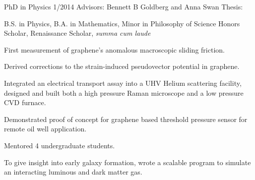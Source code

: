 {\begin{singlespace}
\bigspace

{
	\newline
	PhD in Physics 1/2014\newline
	Advisors: Bennett B Goldberg and Anna Swan \newline
	Thesis: \thesistitlelower 

	\newline
	B.S. in Physics, B.A. in Mathematics, Minor in Philosophy of Science\newline
	Honors Scholar, Renaissance Scholar, \emph{summa cum laude}\newline
}


{
	\begin{description}[noitemsep,topsep=-5pt,labelindent=15pt]
	\item[Experiment:] First measurement of graphene's anomalous macroscopic sliding friction. 
	\item[Theory:] Derived corrections to the strain-induced pseudovector potential in graphene.
	\item[Aperatus design:] Integrated an electrical transport assay into a UHV Helium scattering facility, designed and built both a high pressure Raman microscope and a low pressure CVD furnace.
	\item[Device:] Demonstrated proof of concept for graphene based threshold pressure sensor for remote oil well application.
	\item[Mentoring:] Mentored 4 undergraduate students.
	\end{description}
	\vspace{\sspace}

	 \newline
	To give insight into early galaxy formation, wrote a scalable program to simulate an interacting luminous and dark matter gas.
	 
}
\end{singlespace}}
